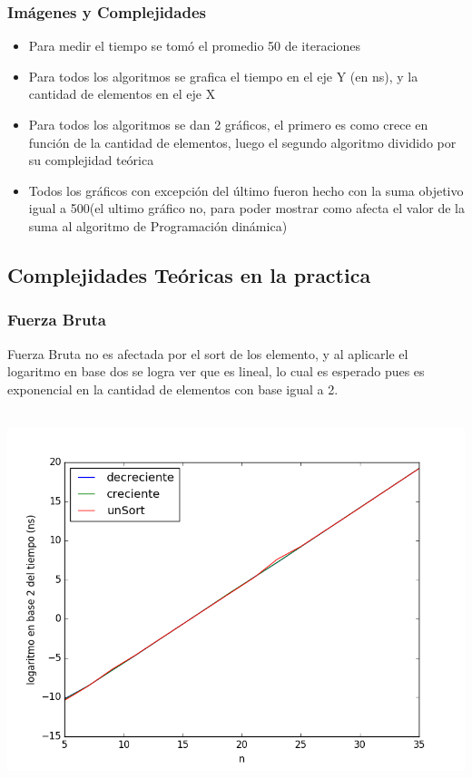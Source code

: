 \subsubsection{Im\'agenes y Complejidades}
\begin{itemize}
	\item Para medir el tiempo se tomó el promedio 50 de iteraciones
	\item Para todos los algoritmos se grafica el tiempo en el eje Y (en ns), y la cantidad de elementos en el eje X
	\item Para todos los algoritmos se dan 2 gr\'aficos, el primero es como crece en funci\'on de la cantidad de elementos, luego el segundo algoritmo dividido por su complejidad te\'orica
	\item Todos los gr\'aficos con excepci\'on del \'ultimo fueron hecho con la suma objetivo igual a 500(el ultimo gr\'afico no, para poder mostrar como afecta el valor de la suma al algoritmo de Programaci\'on din\'amica)
\end{itemize}	
\subsection{Complejidades Te\'oricas en la practica}
\subsubsection{Fuerza Bruta}
Fuerza Bruta no es afectada por el sort de los elemento, y al aplicarle el logaritmo en base dos se logra ver que es lineal, lo cual es esperado pues es exponencial en la cantidad de elementos con base igual a 2.
\begin{center}
\includegraphics[width=16cm, height=11cm]{fbSort.png}
\end{center}

